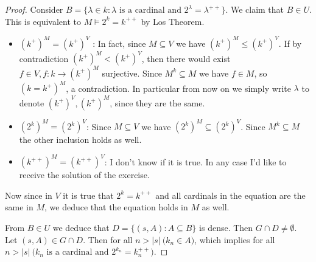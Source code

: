 \documentclass[a4paper,12pt]{article}
\theoremstyle{plain}
\theoremstyle{definition}
\theoremstyle{remark}
\begin{document}
\begin{proof}		

	Consider $B = \{\lambda \in k : \lambda \text{ is a cardinal and } 2^{\lambda} = \lambda^{++}\}$.
	We claim that $B \in U$. This is equivalent to $M \models 2^{k} = k^{++}$ by Los Theorem.
	\begin{itemize}
		\item $(k^{+})^M = (k^{+})^V$ : In fact, since $M \subseteq V$ we have $(k^{+})^M \leq (k^{+})^{V}$. 
			If by contradiction $(k^{+})^{M} < (k^{+})^{V}$, then there would exist $f \in V, f:k \to (k^{+})^{M}$ surjective.
			Since $M^{k} \subseteq M$ we have $f \in M$, so $(k = k^{+})^M$, a contradiction.
			In particular from now on we simply write $\lambda$ to denote $(k^{+})^{V}, (k^{+})^{M}$, since they are the same.

		\item $(2^{k})^M = (2^{k})^V$: Since $M \subseteq V$ we have $(2^{k})^M \subseteq (2^{k})^V$. Since $M^{k} \subseteq M$ the other
			inclusion holds as well.

		\item $(k^{++})^M = (k^{++})^V$: I don't know if it is true. In any case I'd like to receive the solution of the exercise.

	\end{itemize}
	Now since in $V$ it is true that $2^{k} = k^{++}$ and all cardinals in the equation are the same in $M$, we deduce that the equation
	holds in $M$ as well.

	From $B \in U$ we deduce that $D = \{(s,A) : A \subseteq B\}$ is dense.
	Then $G \cap D \not = \emptyset$. Let $(s,A) \in G \cap D$.
	Then for all $n > |s| \ \big( k_n \in A \big)$, which implies for all $n > |s| \ \big( k_n \text{ is a cardinal and } 2^{k_n} = k_n ^{++}\big)$.

\end{proof}
\end{document}
